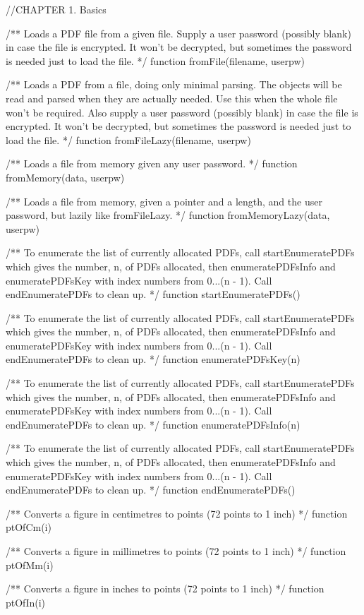 //CHAPTER 1. Basics

/** Loads a PDF file from a given file. Supply a user password (possibly blank)
in case the file is encrypted. It won't be decrypted, but sometimes the
password is needed just to load the file. */
function fromFile(filename, userpw)

/** Loads a PDF from a file, doing only minimal parsing. The objects will be
read and parsed when they are actually needed. Use this when the whole file
won't be required. Also supply a user password (possibly blank) in case the
file is encrypted. It won't be decrypted, but sometimes the password is needed
just to load the file. */
function fromFileLazy(filename, userpw)

/** Loads a file from memory given any user password. */
function fromMemory(data, userpw)

/** Loads a file from memory, given a pointer and a length, and the user
password, but lazily like fromFileLazy. */
function fromMemoryLazy(data, userpw)

/** To enumerate the list of currently allocated PDFs, call startEnumeratePDFs
which gives the number, n, of PDFs allocated, then enumeratePDFsInfo and
enumeratePDFsKey with index numbers from 0...(n - 1). Call endEnumeratePDFs to
clean up. */
function startEnumeratePDFs()

/** To enumerate the list of currently allocated PDFs, call startEnumeratePDFs
which gives the number, n, of PDFs allocated, then enumeratePDFsInfo and
enumeratePDFsKey with index numbers from 0...(n - 1). Call endEnumeratePDFs to
clean up. */
function enumeratePDFsKey(n)

/** To enumerate the list of currently allocated PDFs, call startEnumeratePDFs
which gives the number, n, of PDFs allocated, then enumeratePDFsInfo and
enumeratePDFsKey with index numbers from 0...(n - 1). Call endEnumeratePDFs to
clean up. */
function enumeratePDFsInfo(n)

/** To enumerate the list of currently allocated PDFs, call startEnumeratePDFs
which gives the number, n, of PDFs allocated, then enumeratePDFsInfo and
enumeratePDFsKey with index numbers from 0...(n - 1). Call endEnumeratePDFs to
clean up. */
function endEnumeratePDFs()

/** Converts a figure in centimetres to points (72 points to 1 inch) */
function ptOfCm(i)

/** Converts a figure in millimetres to points (72 points to 1 inch) */
function ptOfMm(i)

/** Converts a figure in inches to points (72 points to 1 inch) */
function ptOfIn(i)

